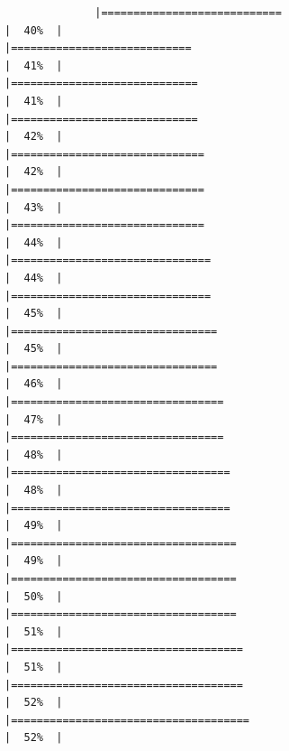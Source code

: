 \documentclass[
]{article}
\begin{document}
\begin{verbatim}
              |============================                                          |  40%  |                                                                              |============================                                          |  41%  |                                                                              |=============================                                         |  41%  |                                                                              |=============================                                         |  42%  |                                                                              |==============================                                        |  42%  |                                                                              |==============================                                        |  43%  |                                                                              |==============================                                        |  44%  |                                                                              |===============================                                       |  44%  |                                                                              |===============================                                       |  45%  |                                                                              |================================                                      |  45%  |                                                                              |================================                                      |  46%  |                                                                              |=================================                                     |  47%  |                                                                              |=================================                                     |  48%  |                                                                              |==================================                                    |  48%  |                                                                              |==================================                                    |  49%  |                                                                              |===================================                                   |  49%  |                                                                              |===================================                                   |  50%  |                                                                              |===================================                                   |  51%  |                                                                              |====================================                                  |  51%  |                                                                              |====================================                                  |  52%  |                                                                              |=====================================                                 |  52%  |                                                                 
\end{verbatim}
\end{document}
